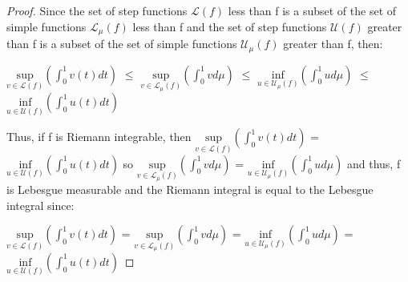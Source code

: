     \begin{proof}
        Since the set of step functions $\mathcal{L}(f)$ less than f is a subset of
        the set of simple functions $\mathcal{L}_{\mu}(f)$ less than f and
        the set of step functions $\mathcal{U}(f)$ greater than f is a subset of
        the set of simple functions $\mathcal{U}_{\mu}(f)$ greater than f, then:

        \hspace{0.5cm}
        $\underset{v \in \mathcal{L}(f)}{\text{sup}}(\int_0^1 v(t) dt)$
        $\leq$ $\underset{v \in \mathcal{L}_{\mu}(f)}{\text{sup}}(\int_0^1 v d\mu)$
        $\leq$ $\underset{u \in \mathcal{U}_{\mu}(f)}{\text{inf}}(\int_0^1 u d\mu)$
        $\leq$ $\underset{u \in \mathcal{U}(f)}{\text{inf}}(\int_0^1 u(t) dt)$

        Thus, if f is Riemann integrable,
        then
        $\underset{v \in \mathcal{L}(f)}{\text{sup}}(\int_0^1 v(t) dt)$
        = $\underset{u \in \mathcal{U}(f)}{\text{inf}}(\int_0^1 u(t) dt)$
        so $\underset{v \in \mathcal{L}_{\mu}(f)}{\text{sup}}(\int_0^1 v d\mu)$
        = $\underset{u \in \mathcal{U}_{\mu}(f)}{\text{inf}}(\int_0^1 u d\mu)$
        and thus, f is Lebesgue measurable
        and the Riemann integral is equal to the Lebesgue integral
        since:

        \hspace{0.5cm}
        $\underset{v \in \mathcal{L}(f)}{\text{sup}}(\int_0^1 v(t) dt)$
        = $\underset{v \in \mathcal{L}_{\mu}(f)}{\text{sup}}(\int_0^1 v d\mu)$
        = $\underset{u \in \mathcal{U}_{\mu}(f)}{\text{inf}}(\int_0^1 u d\mu)$
        = $\underset{u \in \mathcal{U}(f)}{\text{inf}}(\int_0^1 u(t) dt)$
    \end{proof}




    